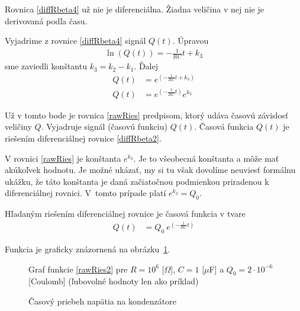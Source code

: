 \documentclass[a4paper, 10pt, ]{article}
\begin{document}
\bigskip

Rovnica \eqref{diffRbeta4} už nie je diferenciálna. Žiadna veličina v nej nie je derivovaná podľa času.

Vyjadrime z rovnice \eqref{diffRbeta4} signál $Q(t)$. Úpravou
\begin{align}
    \ln \left(  Q(t)  \right)  =   - \frac{1}{RC} t + k_3
\end{align}
sme zaviedli konštantu $k_3 = k_2 - k_1$. Ďalej
\begin{subequations}
    \begin{align}
        Q(t)   &=  e^{\left( - \frac{1}{RC} t + k_3 \right)} \\
        Q(t)   &=  e^{\left( - \frac{1}{RC} t \right)}  e^{k_3} \label{rawRies}
    \end{align}
\end{subequations}

Už v tomto bode je rovnica \eqref{rawRies} predpisom, ktorý udáva časovú závislosť veličiny $Q$. Vyjadruje signál (časovú funkciu) $Q(t)$. Časová funkcia $Q(t)$ je riešením diferenciálnej rovnice \eqref{diffRbeta2}.

V rovnici \eqref{rawRies} je konštanta $e^{k_3}$. Je to všeobecná konštanta a môže mať akúkoľvek hodnotu. Je možné ukázať, my si tu však dovolíme neuviesť formálnu ukážku, že táto konštanta je daná začiatočnou podmienkou priradenou k diferenciálnej rovnici. V~tomto prípade platí $e^{k_3} = Q_0$.

Hľadaným riešením diferenciálnej rovnice je časová funkcia v tvare
\begin{align}
    Q(t)   &=  Q_0 \ e^{\left( - \frac{1}{RC} t \right)}   \label{rawRies2}
\end{align}


\noindent
Funkcia je graficky znázornená na obrázku~\ref{Graffunkcie}.








\begin{figure}[!t]
	\centering


	\caption{Graf funkcie \eqref{rawRies2} pre $R = 10^6$ [$\Omega$], $C = 1$ [$\mu$F] a $Q_0 = 2\cdot 10^{-6}$ [Coulomb] (ľubovolné hodnoty len ako príklad)}
	\label{Graffunkcie}
\end{figure}



\begin{figure}[!b]
	\centering


	\caption{Časový priebeh napätia na kondenzátore}
	\label{PriebehNapatieDefault}
\end{figure}
\end{document}
